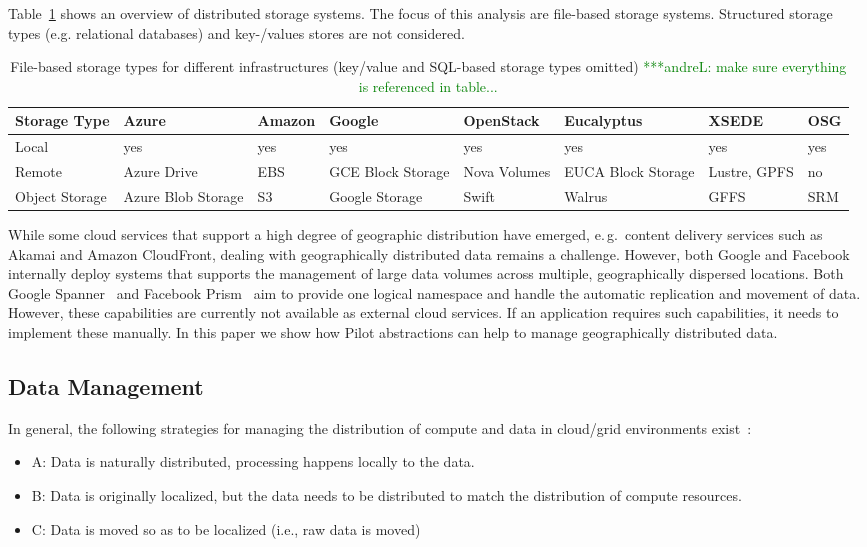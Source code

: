\documentclass[times]{cpeauth}
\newcommand{\alnote}[1]{ {\textcolor{green} { ***andreL: #1 }}}
\newcommand{\alnote}[1]{}
\newcommand{\pilot}{Pilot\xspace}
\begin{document}
Table~\ref{tab:storage-systems} shows an overview of distributed
storage systems. The focus of this analysis are file-based storage
systems. Structured storage types (e.g. relational databases) and
key-/values stores are not considered.

\begin{table}[t]
\centering
\begin{tabular}{|p{1.7cm}|p{1.3cm}|p{1.3cm}|p{1.3cm}|p{1.4cm}|p{1.4cm}|p{1.3cm}|p{1.2cm}|}
	\hline
	\textbf{Storage Type} &\textbf{Azure} &\textbf{Amazon} &\textbf{Google} &\textbf{Open\-Stack} &\textbf{Euca\-lyptus} &\textbf{XSEDE}  &\textbf{OSG} \\
	\hline
	Local	&yes &yes &yes &yes &yes &yes &yes\\
	\hline
	Remote &Azure Drive &EBS &GCE Block Storage &Nova Volumes &EUCA Block Storage &Lustre, GPFS 
	&no\\
	\hline
	Object Storage &Azure Blob Storage &S3 &Google Storage &Swift & Walrus &GFFS
	 &SRM\\
	\hline	
\end{tabular}
\caption{File-based storage types for different infrastructures (key/value and 
SQL-based storage types omitted)\alnote{make sure everything is referenced in table...}  \label{tab:storage-systems}}
\end{table}


While some cloud services that support a high degree of geographic
distribution have emerged, e.\,g.\ content delivery services such as
Akamai and Amazon CloudFront, dealing with geographically distributed
data remains a challenge. However, both Google and Facebook internally
deploy systems that supports the management of large data volumes
across multiple, geographically dispersed locations. Both Google
Spanner~\cite{dean09} and Facebook Prism~\cite{Metz12} aim to provide
one logical namespace and handle the automatic replication and
movement of data. However, these capabilities are currently not
available as external cloud services. If an application requires such
capabilities, it needs to implement these manually. In this paper we
show how \pilot abstractions can help to manage geographically
distributed data.

\subsection{Data Management}

In general, the following strategies for managing the distribution of compute 
and data in cloud/grid environments exist~\cite{jha-katz-2013}:
\begin{itemize}
\item A: Data is naturally distributed, processing happens locally to
	the data.
\item B: Data is originally localized, but the data needs to be distributed to 		
	match the distribution of compute resources.
\item C: Data is moved so as to be localized (i.e., raw data is moved)
\end{itemize}
\end{document}
